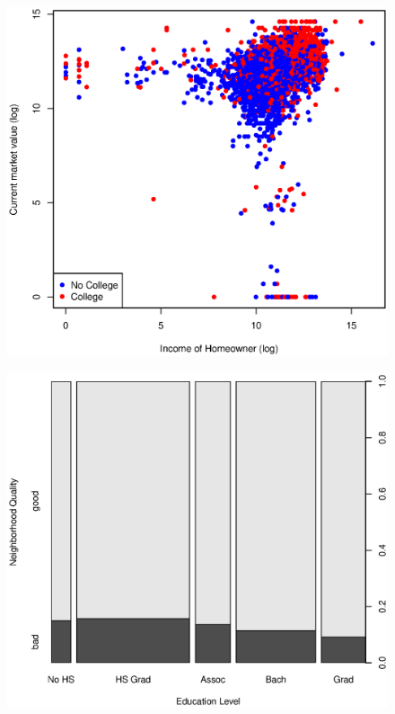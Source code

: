 \documentclass[11pt, fleqn]{article}
\begin{document}
\begin{figure}[!htb]
  \centering
  \includegraphics[scale=.5]{income.eps}
  \caption{}
  \label{fig:income}
\end{figure}

\begin{figure}[!htb]
  \centering
  \includegraphics[scale=.5]{neighborhood_quality_vs_education.eps}
  \caption{}
  \label{fig:education_qual}
\end{figure}
\end{document}
